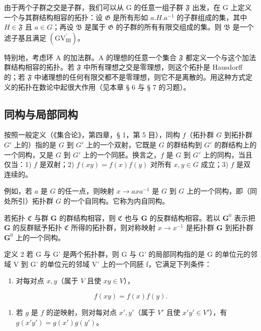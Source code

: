 由于两个子群之交是子群，我们可以从 G 的任意一组子群 \(\mathfrak{F}\) 出发，在 G 上定义一个与其群结构相容的拓扑：设 \(\mathfrak{G}\) 是所有形如 \(a.H.a^{-1}\) 的子群组成的集，其中 \(H\in\mathfrak{F}\) 且 \(a\in G\)；再设 \(\mathfrak{B}\) 是属于 \(\mathfrak{G}\) 的子群的所有有限交组成的集。则 \(\mathfrak{B}\) 是一个滤子基且满足 \((\mathrm{GV}_{\mathrm{III}}^{\prime})\)。

特别地，考虑环 A 的加法群。A 的理想的任意一个集合 \(\mathfrak{F}\) 都定义一个与这个加法群结构相容的拓扑。若 \(\mathfrak{F}\) 中所有理想之交是零理想，则这个拓扑是 Hausdorff 的；若 \(\mathfrak{F}\) 中诸理想的任何有限交都不是零理想，则它不是离散的。用这种方式定义的拓扑在数论中起很大作用（见本章 § 6 与 § 7 的习题）。

\subsection{同构与局部同构}

按照一般定义（《集合论》，第四章，§ 1，第 5 目），同构 \(f\)（拓扑群 \(G\) 到拓扑群 \(G'\) 上的）指的是 \(G\) 到 \(G'\) 上的一个双射，它既是 \(G\) 的群结构到 \(G'\) 的群结构上的一个同构，又是 \(G\) 到 \(G'\) 上的一个同胚。换言之，\(f\) 是 \(G\) 到 \(G'\) 上的同构，当且仅当：1) \(f\) 是双射；2) \(f(xy) = f(x)f(y)\) 对所有 \(x, y \in G\) 成立；3) \(f\) 是双连续的。

例如，若 \(a\) 是 \(G\) 的任一点，则映射 \(x \to axa^{-1}\) 是 \(G\) 到 \(G\) 上的一个同构，即（同处所引）拓扑群 \(G\) 的一个自同构。它称为内自同构。

若拓扑 \(\mathfrak{C}\) 与群 \(\mathbf{G}\) 的群结构相容，则 \(\mathfrak{C}\) 也与 \(\mathbf{G}\) 的反群结构相容。若以 \(\mathbf{G}^0\) 表示把 \(\mathbf{G}\) 的反群赋予拓扑 \(\mathfrak{C}\) 所得的拓扑群，则对称映射 \(x \to x^{-1}\) 是拓扑群 \(\mathbf{G}\) 到拓扑群 \(\mathbf{G}^0\) 上的一个同构。

定义 2 若 G 与 G' 是两个拓扑群，则 G 与 G' 的局部同构指的是 G 的单位元的邻域 V 到 G' 的单位元的邻域 V' 上的一个同胚 f，它满足下列条件：

\begin{enumerate}
\def\labelenumi{\arabic{enumi})}
\tightlist
\item
  对每对点 \(x, y\)（属于 \(V\) 且使 \(xy \in V\)），
\end{enumerate}

\[
f (x y) = f (x) f (y).
\]

\begin{enumerate}
\def\labelenumi{\arabic{enumi})}
\setcounter{enumi}{1}
\tightlist
\item
  若 \(g\) 是 \(f\) 的逆映射，则对每对点 \(x', y'\)（属于 \(V'\) 且使 \(x'y' \in V'\)），有 \(g(x'y') = g(x')g(y')\)。
\end{enumerate}

